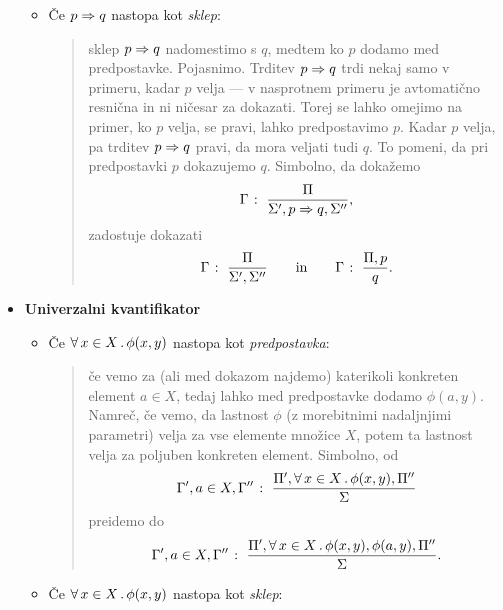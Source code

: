 \begin{itemize}
\begin{itemize}
                                \item
                                        Če $p \Rightarrow q$ nastopa kot \emph{sklep}:
                                        \begin{quote}
                                                sklep $p \Rightarrow q$ nadomestimo s $q$, medtem ko $p$ dodamo med predpostavke. Pojasnimo. Trditev $p \Rightarrow q$ trdi nekaj samo v primeru, kadar $p$ velja --- v nasprotnem primeru je avtomatično resnična in ni ničesar za dokazati. Torej se lahko omejimo na primer, ko $p$ velja, se pravi, lahko predpostavimo $p$. Kadar $p$ velja, pa trditev $p \Rightarrow q$ pravi, da mora veljati tudi $q$. To pomeni, da pri predpostavki $p$ dokazujemo $q$. Simbolno, da dokažemo
                                                \[{\Gamma} \;\colon\; \frac{\Pi}{\Sigma', p \Rightarrow q, \Sigma''},\]
                                                zadostuje dokazati
                                                \[{\Gamma} \;\colon\; \frac{\Pi}{\Sigma', \Sigma''} \qquad \text{in} \qquad {\Gamma} \;\colon\; \frac{\Pi, p}{q}.\]
                                        \end{quote}
                        \end{itemize}
                \item\textbf{Univerzalni kvantifikator}
                        \begin{itemize}
                                \item
                                        Če $\xall{x}[X]{\phi(x, y)}$ nastopa kot \emph{predpostavka}:
                                        \begin{quote}
                                                če vemo za (ali med dokazom najdemo) katerikoli konkreten element $a \in X$, tedaj lahko med predpostavke dodamo $\phi(a, y)$. Namreč, če vemo, da lastnost $\phi$ (z morebitnimi nadaljnjimi parametri) velja za vse elemente množice $X$, potem ta lastnost velja za poljuben konkreten element. Simbolno, od
                                                \[\claim{\Gamma', a \in X, \Gamma''}{\Pi', \xall{x}[X]{\phi(x, y)}, \Pi''}{\Sigma}\]
                                                preidemo do
                                                \[\claim{\Gamma', a \in X, \Gamma''}{\Pi', \xall{x}[X]{\phi(x, y)}, \phi(a, y), \Pi''}{\Sigma}.\]
                                        \end{quote}
                                \item
                                        Če $\xall{x}[X]{\phi(x, y)}$ nastopa kot \emph{sklep}:

\end{itemize}
\end{itemize}
